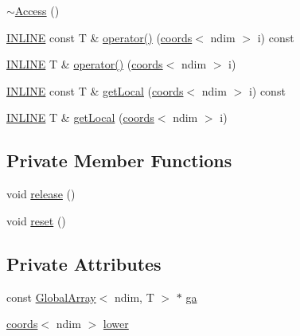 \begin{DoxyCompactItemize}
\item 
\hyperlink{classshark_1_1ndim_1_1_access_a2957f851de845382e05955892506a2f1}{$\sim$\+Access} ()
\item 
\hyperlink{common_8hpp_a2eb6f9e0395b47b8d5e3eeae4fe0c116}{I\+N\+L\+I\+NE} const T \& \hyperlink{classshark_1_1ndim_1_1_access_a3f9cceefe7a04c4e50c6f96de0296a15}{operator()} (\hyperlink{structshark_1_1ndim_1_1coords}{coords}$<$ ndim $>$ i) const
\item 
\hyperlink{common_8hpp_a2eb6f9e0395b47b8d5e3eeae4fe0c116}{I\+N\+L\+I\+NE} T \& \hyperlink{classshark_1_1ndim_1_1_access_a67b1107ce87e39d19e2112e26f2f15c5}{operator()} (\hyperlink{structshark_1_1ndim_1_1coords}{coords}$<$ ndim $>$ i)
\item 
\hyperlink{common_8hpp_a2eb6f9e0395b47b8d5e3eeae4fe0c116}{I\+N\+L\+I\+NE} const T \& \hyperlink{classshark_1_1ndim_1_1_access_a1701e437e4c435473672500f678f41ac}{get\+Local} (\hyperlink{structshark_1_1ndim_1_1coords}{coords}$<$ ndim $>$ i) const
\item 
\hyperlink{common_8hpp_a2eb6f9e0395b47b8d5e3eeae4fe0c116}{I\+N\+L\+I\+NE} T \& \hyperlink{classshark_1_1ndim_1_1_access_a8fe86487f1b5a1b5af26798665cb09b8}{get\+Local} (\hyperlink{structshark_1_1ndim_1_1coords}{coords}$<$ ndim $>$ i)
\end{DoxyCompactItemize}
\subsection*{Private Member Functions}
\begin{DoxyCompactItemize}
\item 
void \hyperlink{classshark_1_1ndim_1_1_access_a22c889d50f5f45566ee12cf04f874701}{release} ()
\item 
void \hyperlink{classshark_1_1ndim_1_1_access_ae3aeb7637a41a2da81bcda20772ccac4}{reset} ()
\end{DoxyCompactItemize}
\subsection*{Private Attributes}
\begin{DoxyCompactItemize}
\item 
const \hyperlink{classshark_1_1ndim_1_1_global_array}{Global\+Array}$<$ ndim, T $>$ $\ast$ \hyperlink{classshark_1_1ndim_1_1_access_abc59e261a07fcecc3f1db641ef04efa7}{ga}
\item 
\hyperlink{structshark_1_1ndim_1_1coords}{coords}$<$ ndim $>$ \hyperlink{classshark_1_1ndim_1_1_access_ac1e92dba307ff877963c94bd42fcbafb}{lower}
\end{DoxyCompactItemize}


